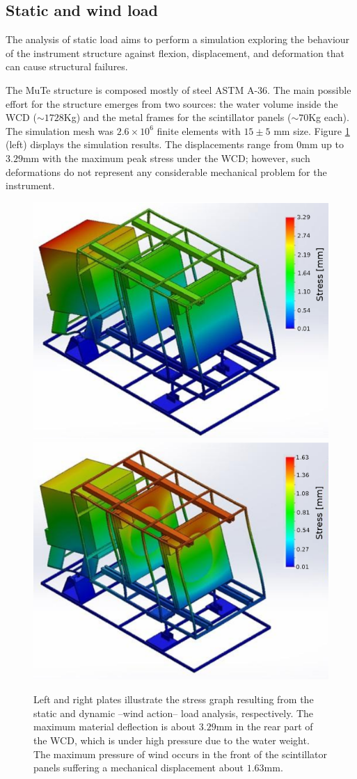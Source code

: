 \documentclass[letterpaper,11pt]{article}
\begin{document}
\subsection{Static and wind load}
The analysis of static load aims to perform a simulation exploring the behaviour of the instrument structure against flexion, displacement, and deformation that can cause structural failures. 

The MuTe structure is composed mostly of steel ASTM A-36. The main possible effort for the structure emerges from two sources: the water volume inside the WCD ($\sim 1728$Kg) and the metal frames for the scintillator panels ($\sim 70$Kg each). The simulation mesh was $2.6 \times 10^6$ finite elements with $15 \pm 5$ mm size. Figure \ref{fig:stress} (left) displays the simulation results. The displacements range from  $0$mm up to $3.29$mm with the maximum peak stress under the WCD; however, such deformations do not represent any considerable mechanical problem for the instrument.
\begin{figure}[htb]
\centering
\includegraphics[width=0.48\columnwidth]{Figures/stress_graph.eps}
\includegraphics[width=0.48\columnwidth]{Figures/stress_graph_wind.eps}
\caption{Left and right plates illustrate the stress graph resulting from the static and dynamic --wind action-- load analysis, respectively. The maximum material deflection is about $3.29$mm in the rear part of the WCD, which is under high pressure due to the water weight.  The maximum pressure of wind occurs in the front of the scintillator panels suffering a mechanical displacement about $1.63$mm.}
\label{fig:stress}
\end{figure}
\end{document}
